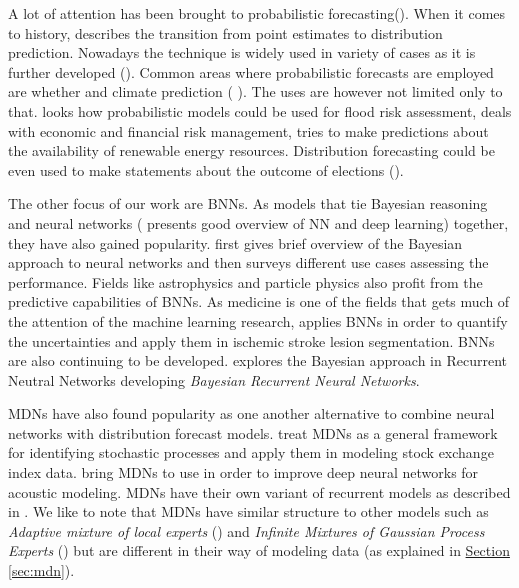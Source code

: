 \documentclass[12pt,a4paper,twoside]{scrartcl}
\numberwithin{equation}{section}
\newcommand{\refsec}[1]{\hyperref[#1]{Section \ref*{#1}}}
\begin{document}
A lot of attention has been brought to probabilistic forecasting(\cite{gneiting2014}). When it comes to history, \cite{stigler1975} describes the transition from point estimates to distribution prediction. Nowadays the technique is widely used in variety of cases as it is further developed (\cite{ehm2012}). Common areas  where probabilistic forecasts are employed are whether and climate  prediction ( \cite{collins2007}). The uses are however not limited only to that. \cite{krzysztofowic2001} looks how probabilistic models could be used for flood risk assessment, \cite{timmermann2001} deals with economic and financial risk management, \cite{pinson2013} tries to make predictions about the availability of renewable energy resources. Distribution forecasting could be even used to make statements about the outcome of elections (\cite{montgomery2012}).

The other focus of our work are BNNs. As models that tie Bayesian reasoning and neural networks (\cite{schmidhuber2015} presents good overview of NN and deep learning) together, they have also gained popularity. \cite{vehtari2001} first gives brief overview of the Bayesian approach to neural networks and then surveys different use cases assessing the performance. Fields like astrophysics \cite{bai2016} and particle physics \cite{bhat2015} also profit from the predictive capabilities of BNNs. As medicine is one of the fields that gets much of the attention of the machine learning research, \cite{kwon2017} applies BNNs in order to quantify the uncertainties and apply them in ischemic stroke lesion segmentation. BNNs are also continuing to be developed. \cite{fortunato2017} explores the Bayesian approach in Recurrent Neutral Networks developing \emph{Bayesian Recurrent Neural Networks}.

MDNs have also found popularity as one another alternative to combine neural networks with distribution forecast models. \cite{schittenkopf1998} treat MDNs as a general framework for identifying stochastic processes and apply them in modeling stock exchange index data. \cite{zen2014} bring MDNs to use in order to improve deep neural networks for acoustic modeling. MDNs have their own variant of recurrent models as described in \cite{miazhynskaia2003}. We like to note that  MDNs have similar structure to other models such as \emph{Adaptive mixture of local experts} (\cite{jacobs1991}) and \emph{Infinite Mixtures of Gaussian Process Experts} (\cite{rasmussen2002}) but are different in their way of modeling data (as explained in \refsec{sec:mdn}).
\end{document}
